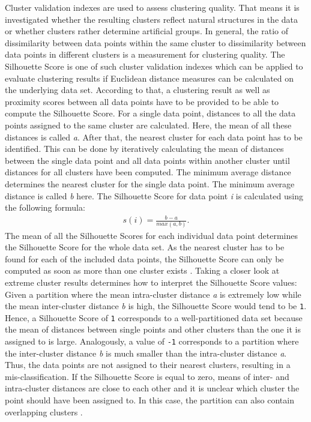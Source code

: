 Cluster validation indexes are used to assess clustering quality. That means it is investigated whether the resulting clusters reflect natural structures in the data or whether clusters rather determine artificial groups. In general, the ratio of dissimilarity between data points within the same cluster to dissimilarity between data points in different clusters is a measurement for clustering quality. 
The Silhouette Score is one of such cluster validation indexes which can be applied to evaluate clustering results if Euclidean distance measures can be calculated on the underlying data set. According to that, a clustering result as well as proximity scores between all data points have to be provided to be able to compute the Silhouette Score. 
For a single data point, distances to all the data points assigned to the same cluster are calculated. Here, the mean of all these distances is called \textit{a}. After that, the nearest cluster for each data point has to be identified. This can be done by iteratively calculating the mean of distances between the single data point and all data points within another cluster until distances for all clusters have been computed. The minimum average distance determines the nearest cluster for the single data point. 
The minimum average distance is called \textit{b} here. The Silhouette Score for data point \textit{i} is calculated using the following formula:
\begin{align*}
	s(i)=\frac{b - a}{max(a, b)}.
\end{align*}
The mean of all the Silhouette Scores for each individual data point determines the Silhouette Score for the whole data set. As the nearest cluster has to be found for each of the included data points, the Silhouette Score can only be computed as soon as more than one cluster exists \cite{rousseeuw1987silhouettes}.
Taking a closer look at extreme cluster results determines how to interpret the Silhouette Score values: Given a partition where the mean intra-cluster distance \textit{a} is extremely low while the mean inter-cluster distance \textit{b} is high, the Silhouette Score would tend to be \texttt{1}. Hence, a Silhouette Score of \texttt{1} corresponds to a well-partitioned data set because the mean of distances between single points and other clusters than the one it is assigned to is large. Analogously, a value of \texttt{-1} corresponds to a partition where the inter-cluster distance \textit{b} is much smaller than the intra-cluster distance \textit{a}. Thus, the data points are not assigned to their nearest clusters, resulting in a mis-classification. If the Silhouette Score is equal to zero, means of inter- and intra-cluster distances are close to each other and it is unclear which cluster the point should have been assigned to. In this case, the partition can also contain overlapping clusters \cite{rousseeuw1987silhouettes}.
